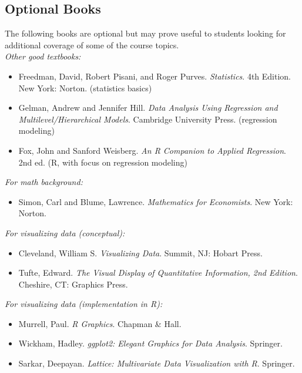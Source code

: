 \documentclass[PS]{syllabus}
\begin{document}
\begin{syllabus}
\subsection*{Optional Books}
The following books are optional but may prove useful to students looking for additional coverage of some of the  course topics. \\

\emph{Other good textbooks:}
\begin{itemize}
\item Freedman, David, Robert Pisani, and Roger Purves. \emph{Statistics}. 4th Edition. New York: Norton. (statistics basics)
\item Gelman, Andrew and Jennifer Hill. \emph{Data Analysis Using Regression and Multilevel/Hierarchical Models}. Cambridge University Press. (regression modeling)
\item Fox, John and Sanford Weisberg. \emph{An R Companion to Applied Regression}. 2nd ed. (R, with focus on regression modeling)
\end{itemize}


\emph{For math background:}
\begin{itemize}
\item Simon, Carl and Blume, Lawrence. \emph{Mathematics for Economists}. New York: Norton.
\end{itemize}



\emph{For visualizing data (conceptual):}
\begin{itemize}
\item Cleveland, William S. \emph{Visualizing Data}. Summit, NJ: Hobart Press.
\item Tufte, Edward. \emph{The Visual Display of Quantitative Information, 2nd Edition}. Cheshire, CT: Graphics Press.
\end{itemize}

\emph{For visualizing data (implementation in R):}
\begin{itemize}
\item Murrell, Paul. \emph{R Graphics}. Chapman \& Hall.
\item Wickham, Hadley. \emph{ggplot2: Elegant Graphics for Data Analysis}. Springer.
\item Sarkar, Deepayan. \emph{Lattice: Multivariate Data Visualization with R}. Springer.
\end{itemize}


\end{syllabus}
\end{document}
